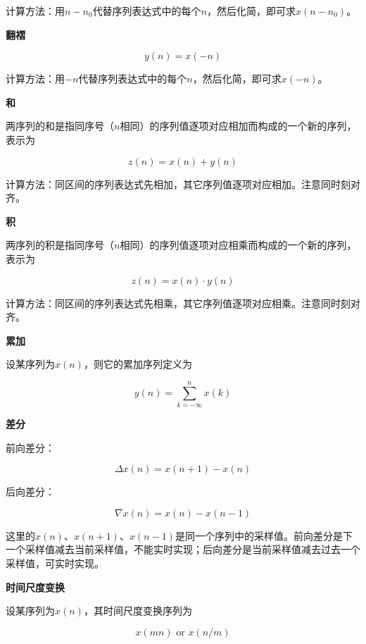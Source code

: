 \documentclass[cn, hazy, blue, normal, 12pt]{elegantnote}
\begin{document}
计算方法：用$n-n_0$代替序列表达式中的每个$n$，然后化简，即可求$x(n-n_0)$。

\textbf{翻褶}

\begin{equation}
        y(n)=x(-n)
\end{equation}

计算方法：用$-n$代替序列表达式中的每个$n$，然后化简，即可求$x(-n)$。

\textbf{和}

两序列的和是指同序号（$n$相同）的序列值逐项对应相加而构成的一个新的序列，表示为

\begin{equation}
        z(n)=x(n)+y(n)
\end{equation}

计算方法：同区间的序列表达式先相加，其它序列值逐项对应相加。注意同时刻对齐。 

\textbf{积}

两序列的积是指同序号（$n$相同）的序列值逐项对应相乘而构成的一个新的序列，表示为

\begin{equation}
        z(n)=x(n)\cdot y(n)
\end{equation}

计算方法：同区间的序列表达式先相乘，其它序列值逐项对应相乘。注意同时刻对齐。

\textbf{累加}

设某序列为$x(n)$，则它的累加序列定义为

\begin{equation}
        y(n)=\sum_{k=-\infty}^n x(k)
\end{equation}

\textbf{差分}

前向差分：

\begin{equation}
        \Delta x(n)=x(n+1)-x(n)
\end{equation}

后向差分：

\begin{equation}
        \nabla x(n)=x(n)-x(n-1)
\end{equation}

这里的$x(n)$、$x(n+1)$、$x(n-1)$是同一个序列中的采样值。前向差分是下一个采样值减去当前采样值，不能实时实现；后向差分是当前采样值减去过去一个采样值，可实时实现。 

\textbf{时间尺度变换}

设某序列为$x(n)$，其时间尺度变换序列为

\begin{equation}
        x(mn) \text{ or } x(n/m)
\end{equation}
\end{document}
